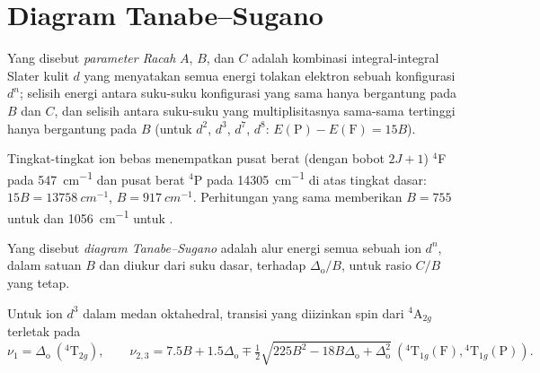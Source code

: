 \section{Diagram Tanabe--Sugano}

\begin{definition}\label{def:b3:complex-spectra-magnetism:racah}
Yang disebut \emph{parameter Racah} $A$, $B$, dan $C$ adalah kombinasi
integral-integral Slater kulit $d$ yang menyatakan semua energi tolakan
elektron sebuah konfigurasi $d^n$; selisih energi antara suku-suku konfigurasi
yang sama hanya bergantung pada $B$ dan $C$, dan selisih antara suku-suku yang
multiplisitasnya sama-sama tertinggi hanya bergantung pada $B$ (untuk $d^2$, $d^3$, $d^7$, $d^8$: $E(\mathrm P) - E(\mathrm F) = 15B$).
\end{definition}

\begin{example}\label{ex:b3:complex-spectra-magnetism:free-B}
Tingkat-tingkat ion  bebas menempatkan pusat berat (dengan bobot $2J + 1$) $^4$F pada
\qty{547}{cm^{-1}} dan pusat berat $^4$P pada \qty{14305}{cm^{-1}} di atas tingkat dasar: $15B = \qty{13758}{cm^{-1}}$,
$B = \qty{917}{cm^{-1}}$. Perhitungan yang sama memberikan $B = 755$ untuk  dan \qty{1056}{cm^{-1}} untuk
.
\end{example}

\begin{definition}\label{def:b3:complex-spectra-magnetism:tanabe-sugano}
Yang disebut \emph{diagram Tanabe--Sugano} adalah alur energi
semua  sebuah ion $d^n$, dalam satuan $B$ dan diukur dari
suku dasar, terhadap $\Delta_{\mathrm o}/B$, untuk rasio $C/B$ yang tetap.
\end{definition}

\begin{proposition}\label{prop:b3:complex-spectra-magnetism:d3-bands}
Untuk ion $d^3$ dalam medan oktahedral, transisi yang diizinkan spin dari $^4$A$_{2g}$ terletak pada
\[
  \nu_1 = \Delta_{\mathrm o}\ (^4\mathrm T_{2g}), \qquad
  \nu_{2,3} = 7.5B + 1.5\Delta_{\mathrm o} \mp \tfrac12\sqrt{225B^2 - 18B\Delta_{\mathrm o} + \Delta_{\mathrm o}^2}\ (^4\mathrm T_{1g}(\mathrm F), {}^4\mathrm T_{1g}(\mathrm P)).
\]
\end{proposition}

